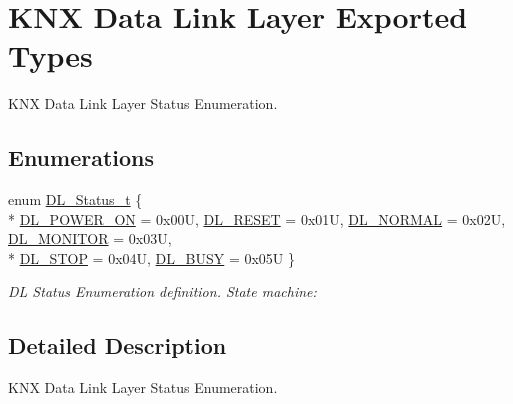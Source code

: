 \hypertarget{group___k_n_x___d_l___exported___types}{}\section{K\+NX Data Link Layer Exported Types}
\label{group___k_n_x___d_l___exported___types}


K\+NX Data Link Layer Status Enumeration.  


\subsection*{Enumerations}
\begin{DoxyCompactItemize}
\item 
enum \hyperlink{group___k_n_x___d_l___exported___types_ga143539be3680d9b7f990a9dfe1df40fe}{D\+L\+\_\+\+Status\+\_\+t} \{ \\*
\hyperlink{group___k_n_x___d_l___exported___types_gga143539be3680d9b7f990a9dfe1df40fea8be7f520654ac8f7854b3caf3b0a5019}{D\+L\+\_\+\+P\+O\+W\+E\+R\+\_\+\+ON} = 0x00U, 
\hyperlink{group___k_n_x___d_l___exported___types_gga143539be3680d9b7f990a9dfe1df40fea80e6219a436df0a34c8533186c5e44c2}{D\+L\+\_\+\+R\+E\+S\+ET} = 0x01U, 
\hyperlink{group___k_n_x___d_l___exported___types_gga143539be3680d9b7f990a9dfe1df40fea461c81727c49b6e32e3caf88887d53bd}{D\+L\+\_\+\+N\+O\+R\+M\+AL} = 0x02U, 
\hyperlink{group___k_n_x___d_l___exported___types_gga143539be3680d9b7f990a9dfe1df40feab460a3cda55e265ecedd269d942e1ef0}{D\+L\+\_\+\+M\+O\+N\+I\+T\+OR} = 0x03U, 
\\*
\hyperlink{group___k_n_x___d_l___exported___types_gga143539be3680d9b7f990a9dfe1df40fea46083fdde5108543c09e29c2c2659cb6}{D\+L\+\_\+\+S\+T\+OP} = 0x04U, 
\hyperlink{group___k_n_x___d_l___exported___types_gga143539be3680d9b7f990a9dfe1df40fea0deb24e69d89cf37a4329769c2b6eb05}{D\+L\+\_\+\+B\+U\+SY} = 0x05U
 \}\begin{DoxyCompactList}\small\item\em DL Status Enumeration definition. State machine\+: \end{DoxyCompactList}
\end{DoxyCompactItemize}


\subsection{Detailed Description}
K\+NX Data Link Layer Status Enumeration. 



